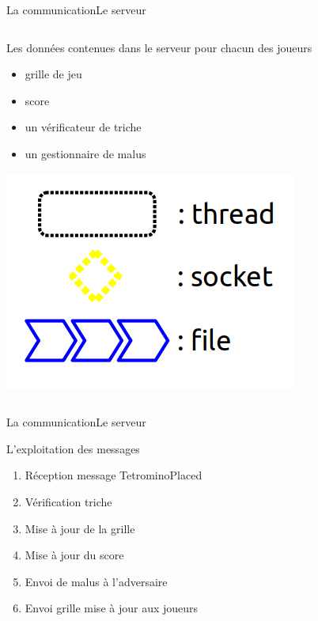 \documentclass[french]{beamer}
\begin{document}
\begin{frame}{La communication}{Le serveur}
\begin{columns}
			\begin{column}{0.5\textwidth}

				\begin{block}{Les données contenues dans le serveur pour chacun des joueurs}
					\begin{itemize}
						\item grille de jeu
						\item score
						\item un vérificateur de triche
						\item un gestionnaire de malus
					\end{itemize}
				\end{block}

				\begin{center}
					\includegraphics[scale=0.25]{img/legende.png}
				\end{center}

			\end{column}

		\end{columns}
	\end{frame}




	\begin{frame}{La communication}{Le serveur}
		\begin{block}{L'exploitation des messages}
			\begin{enumerate}
				\item{Réception message TetrominoPlaced}
				\item{Vérification triche}
				\item{Mise à jour de la grille}
				\item{Mise à jour du score}
				\item{Envoi de malus à l'adversaire}
				\item{Envoi grille mise à jour aux joueurs}
			\end{enumerate}
		\end{block}

	\end{frame}
\end{document}
